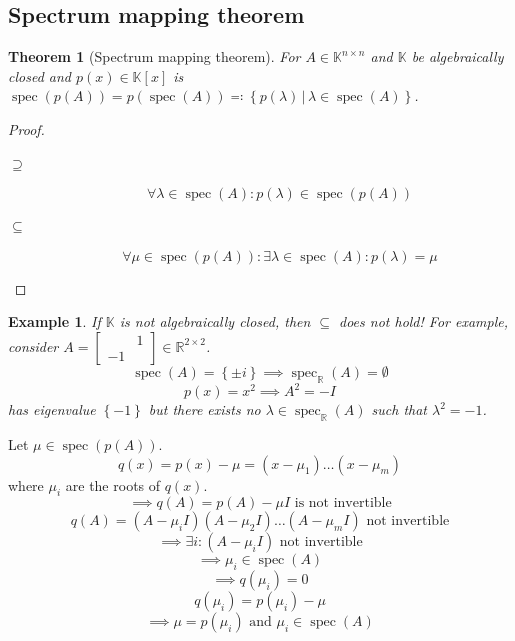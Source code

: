 \documentclass{article}
\newcounter{lecref}[section]
\numberwithin{lecref}{section}
\newtheorem{theorem}[lecref]{Theorem}
\newtheorem{example}[lecref]{Example}
\newcommand{\set}[1]{\left\{#1\right\}}
\newcommand{\setdef}[2]{\left\{\left.#1\,\right|\,#2\right\}}
\begin{document}
\subsection{Spectrum mapping theorem}

\begin{theorem}[Spectrum mapping theorem] %
  For $A \in \mathbb K^{n\times n}$ and $\mathbb K$ be algebraically closed and $p(x) \in \mathbb K[x]$
  is $\operatorname{spec}(p(A)) = p(\operatorname{spec}(A)) \eqqcolon \setdef{p(\lambda)}{\lambda \in \operatorname{spec}(A)}$.
\end{theorem}

\begin{proof}
  \begin{description}
    \item[$\mathbf{\supseteq}$]
      \[ \forall \lambda \in \operatorname{spec}(A): p(\lambda) \in \operatorname{spec}(p(A)) \]
    \item[$\mathbf{\subseteq}$]
      \[ \forall \mu \in \operatorname{spec}(p(A)): \exists \lambda \in \operatorname{spec}(A): p(\lambda) = \mu \]
  \end{description}
\end{proof}

\begin{example} %
  If $\mathbb K$ is not algebraically closed, then $\subseteq$ does not hold!
  For example, consider $A = \begin{bmatrix} & 1 \\ -1 & \end{bmatrix} \in \mathbb R^{2 \times 2}$.
  \[ \operatorname{spec}(A) = \set{\pm i} \implies \operatorname{spec}_{\mathbb R}(A) = \emptyset \]
  \[ p(x) = x^2 \implies A^2 = -I \]
  has eigenvalue $\set{-1}$ but there exists no $\lambda \in \operatorname{spec}_{\mathbb R}(A)$ such that $\lambda^2 = -1$.
\end{example}

Let $\mu \in \operatorname{spec}(p(A))$.
\[ q(x) = p(x) - \mu = (x - \mu_1) \dots (x - \mu_m) \]
where $\mu_i$ are the roots of $q(x)$.
\[ \implies q(A) = p(A) - \mu I \text{ is not invertible} \]
\[ q(A) = (A - \mu_i I)(A - \mu_2 I) \dots (A - \mu_m I) \text{ not invertible} \]
\[ \implies \exists i: (A - \mu_i I) \text{ not invertible} \]
\[ \implies \mu_i \in \operatorname{spec}(A) \]
\[ \implies q(\mu_i) = 0 \]
\[ q(\mu_i) = p(\mu_i) - \mu \]
\[ \implies \mu = p(\mu_i) \text{ and } \mu_i \in \operatorname{spec}(A) \]
\end{document}
